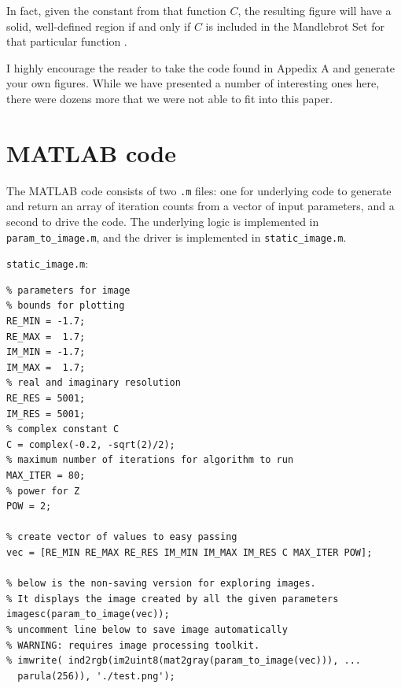 \documentclass[12pt]{article}
\begin{document}
In fact, given the constant from that function $C$, the resulting figure will have a solid, well-defined region if and only if $C$ is included in the Mandlebrot Set for that particular function \cite{Lei89}. 

I highly encourage the reader to take the code found in Appedix A and generate your own figures. While we have presented a number of interesting ones here, there were dozens more that we were not able to fit into this paper.





\appendix
\section{MATLAB code}
The MATLAB code consists of two \texttt{.m} files: one for underlying code to generate and return an array of iteration counts from a vector of input parameters, and a second to drive the code. The underlying logic is implemented in \texttt{param\_to\_image.m}, and the driver is implemented in \texttt{static\_image.m}. 

\bigskip

\texttt{static\_image.m}:
\begin{verbatim}
% parameters for image
% bounds for plotting
RE_MIN = -1.7;
RE_MAX =  1.7;
IM_MIN = -1.7;
IM_MAX =  1.7;
% real and imaginary resolution
RE_RES = 5001;
IM_RES = 5001;
% complex constant C
C = complex(-0.2, -sqrt(2)/2);
% maximum number of iterations for algorithm to run
MAX_ITER = 80;
% power for Z
POW = 2;

% create vector of values to easy passing
vec = [RE_MIN RE_MAX RE_RES IM_MIN IM_MAX IM_RES C MAX_ITER POW];

% below is the non-saving version for exploring images.
% It displays the image created by all the given parameters
imagesc(param_to_image(vec));
% uncomment line below to save image automatically
% WARNING: requires image processing toolkit.
% imwrite( ind2rgb(im2uint8(mat2gray(param_to_image(vec))), ...
  parula(256)), './test.png');
\end{verbatim}

\bigskip
\end{document}

